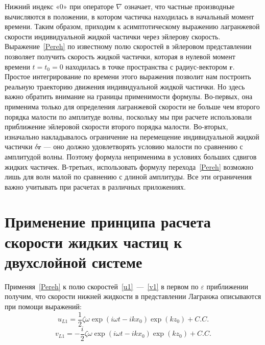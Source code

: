 Нижний индекс «0» при операторе $ \nabla $ означает, что частные производные вычисляются в положении, в котором частичка находилась в начальный момент времени. Таким образом, приходим к асимптотическому выражению лагранжевой скорости индивидуальной жидкой частички через эйлерову скорость. Выражение~\eqref{Pereh} по известному полю скоростей в эйлеровом представлении позволяет получить скорость жидкой частички, которая в нулевой момент времени $ t=t_{0}=0 $ находилась в точке пространства с радиус-вектором $ \mathbf{r} $. Простое интегрирование по времени этого выражения позволит нам построить реальную траекторию движения индивидуальной жидкой частички. Но здесь важно обратить внимание на границы применимости формулы. Во-первых, она применима только для определения лагранжевой скорости не больше чем второго порядка малости по амплитуде волны, поскольку мы при расчете использовали приближение эйлеровой скорости второго порядка малости. Во-вторых, изначально накладывалось ограничение на перемещение индивидуальной жидкой частички $ \delta \mathbf{r} $ --- оно должно удовлетворять условию малости по сравнению с амплитудой волны. Поэтому формула неприменима в условиях больших сдвигов жидких частичек. В-третьих, использовать формулу перехода~\eqref{Pereh} возможно лишь для волн малой по сравнению с длиной амплитуды. Все эти ограничения важно учитывать при расчетах в различных приложениях.

\section{Применение принципа расчета скорости жидких частиц к двухслойной системе}

Применяя~\eqref{Pereh} к полю скоростей~\eqref{u1}~---~\eqref{v1} в первом по $ \varepsilon $ приближении получим, что скорости нижней жидкости в представлении Лагранжа описываются при помощи выражений:
\begin{equation}
u_{L1}=\dfrac{1}{2}\zeta \omega \exp \left( i\omega t-i k x_{0} \right) \exp \left( k z_{0} \right) +C.C.
\label{ul1}
\end{equation}
\begin{equation}
v_{L1}=-\dfrac{i}{2}\zeta \omega \exp \left( i\omega t-i k x_{0} \right) \exp \left( k z_{0} \right) +C.C.
\label{vl1}
\end{equation}

